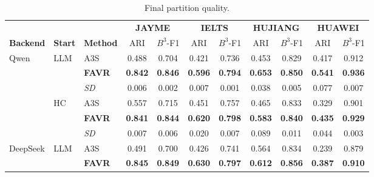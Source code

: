 \begin{table}[!htbp]
\centering
\caption{Final partition quality.}
\label{tab:rq1-baseline}
\begin{minipage}{\linewidth}
\centering
\begingroup
\fontsize{8.5}{9.2}\selectfont
\setlength{\tabcolsep}{2pt}
\renewcommand{\arraystretch}{0.96}
\setlength{\heavyrulewidth}{0.7pt}
\setlength{\lightrulewidth}{0.35pt}
\setlength{\aboverulesep}{1.4pt}
\setlength{\belowrulesep}{1.8pt}
\begin{tabular*}{\linewidth}{@{\extracolsep{\fill}}lllcc@{\hspace{7pt}}cc@{\hspace{7pt}}cc@{\hspace{7pt}}cc@{}}
\toprule
 &  &  & \multicolumn{2}{c}{\textbf{JAYME}} & \multicolumn{2}{c}{\textbf{IELTS}} & \multicolumn{2}{c}{\textbf{HUJIANG}} & \multicolumn{2}{c}{\textbf{HUAWEI}} \\
\cmidrule(lr){4-5}\cmidrule(lr){6-7}\cmidrule(lr){8-9}\cmidrule(l){10-11}
\textbf{Backend} & \textbf{Start} & \textbf{Method} & \multicolumn{1}{c}{ARI} & \multicolumn{1}{c}{$B^3$-F1} & \multicolumn{1}{c}{ARI} & \multicolumn{1}{c}{$B^3$-F1} & \multicolumn{1}{c}{ARI} & \multicolumn{1}{c}{$B^3$-F1} & \multicolumn{1}{c}{ARI} & \multicolumn{1}{c}{$B^3$-F1} \\
\midrule
\multirow[t]{6}{*}{Qwen} & \multirow[t]{3}{*}{LLM} & A3S & 0.488 & 0.704 & 0.421 & 0.736 & 0.453 & 0.829 & 0.417 & 0.912 \\
  &    &  \textbf{FAVR}  & \textbf{0.842} & \textbf{0.846} & \textbf{0.596} & \textbf{0.794} & \textbf{0.653} & \textbf{0.850} & \textbf{0.541} & \textbf{0.936} \\
 & & \quad\textit{SD} & 0.006 & 0.002 & 0.007 & 0.001 & 0.038 & 0.005 & 0.077 & 0.007 \\
\addlinespace[1.5pt]
 & \multirow[t]{3}{*}{HC} & A3S & 0.557 & 0.715 & 0.451 & 0.757 & 0.465 & 0.833 & 0.329 & 0.901 \\
  &    &  \textbf{FAVR}  & \textbf{0.841} & \textbf{0.844} & \textbf{0.620} & \textbf{0.798} & \textbf{0.583} & \textbf{0.840} & \textbf{0.435} & \textbf{0.929} \\
 & & \quad\textit{SD} & 0.007 & 0.006 & 0.020 & 0.007 & 0.089 & 0.011 & 0.044 & 0.003 \\
\midrule
\multirow[t]{6}{*}{DeepSeek} & \multirow[t]{3}{*}{LLM} & A3S & 0.491 & 0.700 & 0.426 & 0.741 & 0.564 & 0.834 & 0.239 & 0.879 \\
  &    &  \textbf{FAVR}  & \textbf{0.845} & \textbf{0.849} & \textbf{0.630} & \textbf{0.797} & \textbf{0.612} & \textbf{0.856} & \textbf{0.387} & \textbf{0.910} \\

\end{tabular*}
\end{minipage}
\end{table}

